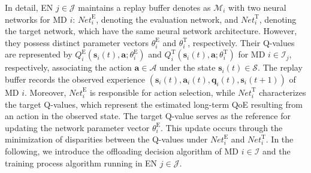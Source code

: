 \documentclass[10pt, journal,letterpaper]{IEEEtran}
\begin{document}
In detail, EN $j \in \mathcal{J}$ maintains a replay buffer denotes as $\mathcal{M}_i$ with two neural networks for MD $i$: $\textit{Net}_i^{\text{E}}$, denoting the evaluation network, and $\textit{Net}_i^{\text{T}}$, denoting the target network, which have the same neural network architecture. However, they possess distinct parameter vectors $\theta^{\text{E}}_i$ and $\theta^{\text{T}}_i$, respectively. Their Q-values are represented by $Q_i^{\text{E}}(\boldsymbol{s}_i(t), \boldsymbol{a}; \theta^{\text{E}}_i)$ and $Q_i^{\text{T}}(\boldsymbol{s}_i(t), \boldsymbol{a}; \theta^{\text{T}}_i)$ for MD $i \in \mathcal{I}_j$, respectively, associating the action $\boldsymbol{a} \in \mathcal{A}$ under the state $\boldsymbol{s}_i(t) \in \mathcal{S}$. The replay buffer records the observed experience $(\boldsymbol{s}_i(t), \boldsymbol{a}_i(t), \boldsymbol{q}_i(t), \boldsymbol{s}_i(t+1))$ of MD $i$. Moreover, $\textit{Net}_i^{\text{E}}$ is responsible for action selection, while $\textit{Net}_i^{\text{T}}$ characterizes the target Q-values, which represent the estimated long-term QoE resulting from an action in the observed state. The target Q-value serves as the reference for updating the network parameter vector $\theta^{\text{E}}_i$. This update occurs through the minimization of disparities between the Q-values under $\textit{Net}_i^{\text{E}}$ and $\textit{Net}_i^{\text{T}}$. In the following, we introduce the offloading decision algorithm of MD $i \in \mathcal{I}$ and the training process algorithm running in EN $j \in \mathcal{J}$.

\end{document}
